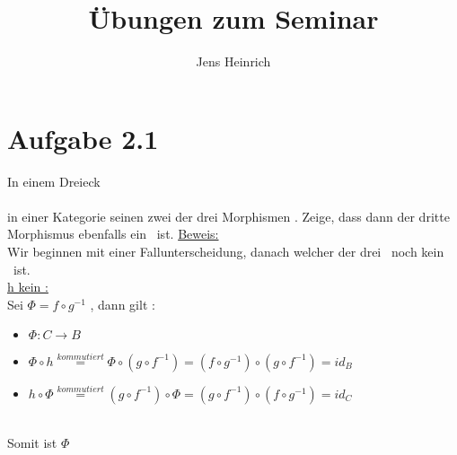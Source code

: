 






\usepackage{bm}

\title{\"Ubungen zum Seminar  }

\author{Jens Heinrich}

 

 

\section*{Aufgabe 2.1}
	In einem Dreieck 
	\\
	
	\\
	in einer Kategorie seinen zwei der drei Morphismen \Ison.
	Zeige, dass dann der dritte Morphismus ebenfalls ein \Iso \ ist.
	\underline{Beweis:} \\
		Wir beginnen mit einer Fallunterscheidung, danach welcher der drei \Morn \ noch kein \Iso \ ist.
		\\
		\underline{h kein \Iso :}
		\\
		Sei 
		\begin{math}
			\Phi=f \circ g^{-1}
		\end{math}		
		, dann gilt :
		\begin{itemize}
			\item 
				\begin{math}
					\Phi : C \to B
				\end{math}
			\item
				\begin{math}
					\Phi \circ h \overset{ kommutiert}{=}
					\Phi \circ \left( 
						g \circ f^{-1} 
						\right) =
					\left( f \circ g^{-1} \right) 
					\circ 
					\left( g \circ f^{-1} \right)= 
					id_{B}
				\end{math}
			\item
				\begin{math}
					h \circ \Phi \overset{ kommutiert}{=}
					\left( 
						g \circ f^{-1}
						\right) \circ \Phi =
					\left( g \circ f^{-1} \right)
					\circ
					\left( f \circ g^{-1} \right)=
					id_{C}
				\end{math}
		\end{itemize}
		\\
		Somit ist 
		\begin{math}
			\Phi
		\end{math}
